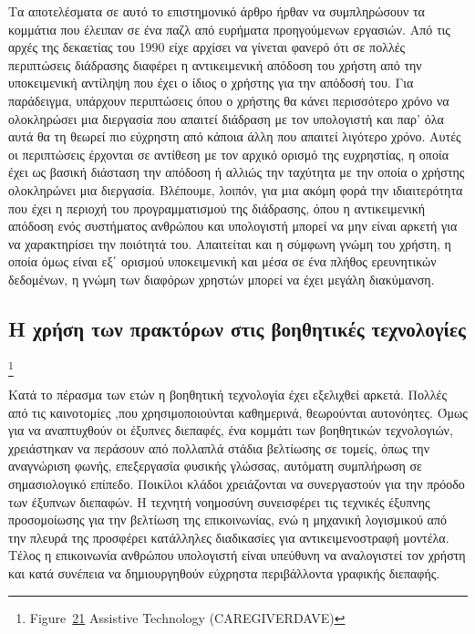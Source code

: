 \documentclass[
]{article}
\begin{document}
Τα αποτελέσματα σε αυτό το επιστημονικό άρθρο ήρθαν να συμπληρώσουν τα
κομμάτια που έλειπαν σε ένα παζλ από ευρήματα προηγούμενων εργασιών. Από
τις αρχές της δεκαετίας του 1990 είχε αρχίσει να γίνεται φανερό ότι σε
πολλές περιπτώσεις διάδρασης διαφέρει η αντικειμενική απόδοση του χρήστη
από την υποκειμενική αντίληψη που έχει ο ίδιος ο χρήστης για την απόδοσή
του. Για παράδειγμα, υπάρχουν περιπτώσεις όπου ο χρήστης θα κάνει
περισσότερο χρόνο να ολοκληρώσει μια διεργασία που απαιτεί διάδραση με
τον υπολογιστή και παρ' όλα αυτά θα τη θεωρεί πιο εύχρηστη από κάποια
άλλη που απαιτεί λιγότερο χρόνο. Αυτές οι περιπτώσεις έρχονται σε
αντίθεση με τον αρχικό ορισμό της ευχρηστίας, η οποία έχει ως βασική
διάσταση την απόδοση ή αλλιώς την ταχύτητα με την οποία ο χρήστης
ολοκληρώνει μια διεργασία. Βλέπουμε, λοιπόν, για μια ακόμη φορά την
ιδιαιτερότητα που έχει η περιοχή του προγραμματισμού της διάδρασης, όπου
η αντικειμενική απόδοση ενός συστήματος ανθρώπου και υπολογιστή μπορεί
να μην είναι αρκετή για να χαρακτηρίσει την ποιότητά του. Απαιτείται και
η σύμφωνη γνώμη του χρήστη, η οποία όμως είναι εξ΄ ορισμού υποκειμενική
και μέσα σε ένα πλήθος ερευνητικών δεδομένων, η γνώμη των διαφόρων
χρηστών μπορεί να έχει μεγάλη διακύμανση.

\hypertarget{ux3b7-ux3c7ux3c1ux3aeux3c3ux3b7-ux3c4ux3c9ux3bd-ux3c0ux3c1ux3b1ux3baux3c4ux3ccux3c1ux3c9ux3bd-ux3c3ux3c4ux3b9ux3c2-ux3b2ux3bfux3b7ux3b8ux3b7ux3c4ux3b9ux3baux3adux3c2-ux3c4ux3b5ux3c7ux3bdux3bfux3bbux3bfux3b3ux3afux3b5ux3c2}{%
\subsection{Η χρήση των πρακτόρων στις βοηθητικές
τεχνολογίες}\label{ux3b7-ux3c7ux3c1ux3aeux3c3ux3b7-ux3c4ux3c9ux3bd-ux3c0ux3c1ux3b1ux3baux3c4ux3ccux3c1ux3c9ux3bd-ux3c3ux3c4ux3b9ux3c2-ux3b2ux3bfux3b7ux3b8ux3b7ux3c4ux3b9ux3baux3adux3c2-ux3c4ux3b5ux3c7ux3bdux3bfux3bbux3bfux3b3ux3afux3b5ux3c2}}

\footnote{Figure~\protect\hyperlink{fig:agent-in-cs}{21} Assistive
  Technology (CAREGIVERDAVE)}

Κατά το πέρασμα των ετών η βοηθητική τεχνολογία έχει εξελιχθεί αρκετά.
Πολλές από τις καινοτομίες ,που χρησιμοποιούνται καθημερινά, θεωρούνται
αυτονόητες. Όμως για να αναπτυχθούν οι έξυπνες διεπαφές, ένα κομμάτι των
βοηθητικών τεχνολογιών, χρειάστηκαν να περάσουν από πολλαπλά στάδια
βελτίωσης σε τομείς, όπως την αναγνώριση φωνής, επεξεργασία φυσικής
γλώσσας, αυτόματη συμπλήρωση σε σημασιολογικό επίπεδο. Ποικίλοι κλάδοι
χρειάζονται να συνεργαστούν για την πρόοδο των έξυπνων διεπαφών. Η
τεχνητή νοημοσύνη συνεισφέρει τις τεχνικές έξυπνης προσομοίωσης για την
βελτίωση της επικοινωνίας, ενώ η μηχανική λογισμικού από την πλευρά της
προσφέρει κατάλληλες διαδικασίες για αντικειμενοστραφή μοντέλα. Τέλος η
επικοινωνία ανθρώπου υπολογιστή είναι υπεύθυνη να αναλογιστεί τον χρήστη
και κατά συνέπεια να δημιουργηθούν εύχρηστα περιβάλλοντα γραφικής
διεπαφής.
\end{document}
